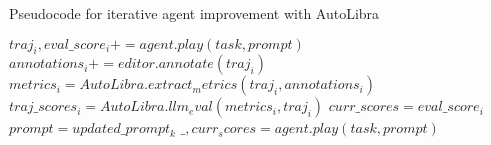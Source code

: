 \begin{algorithm}
    \caption{Pseudocode for iterative agent improvement with AutoLibra}
    \begin{algorithmic}[1]
            \State $traj_i, eval\_score_i += agent.play(task, prompt)$
            \State $annotations_i += editor.annotate(traj_i)$
        \EndFor
        \State $metrics_i = AutoLibra.extract_metrics(traj_i, annotations_i)$
        \State $traj\_scores_i = AutoLibra.llm_eval(metrics_i, traj_i)$
        \State $curr\_scores = eval\_score_i$
            \State $prompt = updated\_prompt_k$
                \State $\_, curr_scores = agent.play(task, prompt)$
            \EndFor
        \EndWhile
    \EndFor

    \end{algorithmic}
\end{algorithm}

